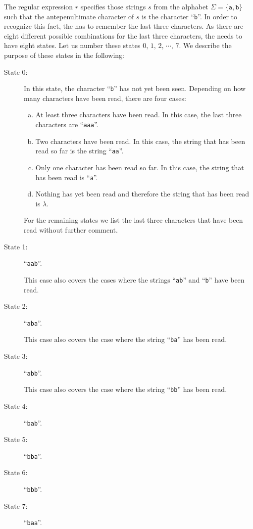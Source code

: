 \solutionEng
The regular expression $r$ specifies those strings $s$ from the alphabet 
$\Sigma = \{ \mathtt{a}, \mathtt{b} \}$ such that the antepenultimate character of $s$ is the
character ``\texttt{b}''.  In order to recognize this fact, the  has to remember the
last three characters.  As there are eight different possible combinations for the last three
characters, the  needs to have eight states.  Let us number these states 
 $0$, $1$, $2$, $\cdots$, $7$.  We describe the purpose of these states in the following:
\begin{description}
\item[State 0:] In this state, the character ``\texttt{b}'' has not yet been seen. 
  Depending on how many characters have been read, there are four cases:
  \begin{enumerate}[(a)]
  \item At least three characters have been read.  In this case, the last three characters are ``\texttt{aaa}''.  
  \item Two characters have been read.  In this case, the string that has been read so far is the string ``\texttt{aa}''.  
  \item Only one character has been read so far. In this case, the string that has been read is ``\texttt{a}''.  
  \item Nothing has yet been read and therefore the string that has been read is $\lambda$.
  \end{enumerate}

                For the remaining states we list the last three characters  that have been read
                without further comment.
\item[State 1:] ``\texttt{aab}''.

                This case also covers the cases where the strings ``\texttt{ab}'' and ``\texttt{b}''
                have been read.
\item[State 2:] ``\texttt{aba}''.

                This case also covers the case where the string ``\texttt{ba}''
                has been read.
\item[State 3:] ``\texttt{abb}''.

                This case also covers the case where the string ``\texttt{bb}''
                has been read.
\item[State 4:] ``\texttt{bab}''.
\item[State 5:] ``\texttt{bba}''.
\item[State 6:] ``\texttt{bbb}''.
\item[State 7:] ``\texttt{baa}''.
\end{description}
